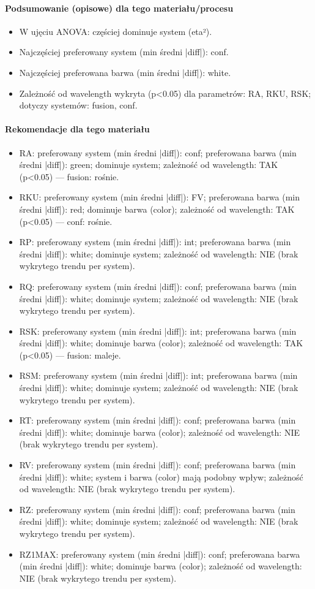 \documentclass[
  10pt,
]{article}
\begin{document}
\paragraph{Podsumowanie (opisowe) dla tego materiału/procesu}
\begin{itemize}
\item W ujęciu ANOVA: częściej dominuje system (eta²).
\item Najczęściej preferowany system (min średni |diff|): conf.
\item Najczęściej preferowana barwa (min średni |diff|): white.
\item Zależność od wavelength wykryta (p<0.05) dla parametrów: RA, RKU, RSK; dotyczy systemów: fusion, conf.
\end{itemize}
\paragraph{Rekomendacje dla tego materiału}
\begin{itemize}
\item RA: preferowany system (min średni |diff|): conf; preferowana barwa (min średni |diff|): green; dominuje system; zależność od wavelength: TAK (p<0.05) — fusion: rośnie.
\item RKU: preferowany system (min średni |diff|): FV; preferowana barwa (min średni |diff|): red; dominuje barwa (color); zależność od wavelength: TAK (p<0.05) — conf: rośnie.
\item RP: preferowany system (min średni |diff|): int; preferowana barwa (min średni |diff|): white; dominuje system; zależność od wavelength: NIE (brak wykrytego trendu per system).
\item RQ: preferowany system (min średni |diff|): conf; preferowana barwa (min średni |diff|): white; dominuje system; zależność od wavelength: NIE (brak wykrytego trendu per system).
\item RSK: preferowany system (min średni |diff|): int; preferowana barwa (min średni |diff|): white; dominuje barwa (color); zależność od wavelength: TAK (p<0.05) — fusion: maleje.
\item RSM: preferowany system (min średni |diff|): int; preferowana barwa (min średni |diff|): white; dominuje system; zależność od wavelength: NIE (brak wykrytego trendu per system).
\item RT: preferowany system (min średni |diff|): conf; preferowana barwa (min średni |diff|): white; dominuje barwa (color); zależność od wavelength: NIE (brak wykrytego trendu per system).
\item RV: preferowany system (min średni |diff|): conf; preferowana barwa (min średni |diff|): white; system i barwa (color) mają podobny wpływ; zależność od wavelength: NIE (brak wykrytego trendu per system).
\item RZ: preferowany system (min średni |diff|): conf; preferowana barwa (min średni |diff|): white; dominuje system; zależność od wavelength: NIE (brak wykrytego trendu per system).
\item RZ1MAX: preferowany system (min średni |diff|): conf; preferowana barwa (min średni |diff|): white; dominuje barwa (color); zależność od wavelength: NIE (brak wykrytego trendu per system).
\end{itemize}
\end{document}

